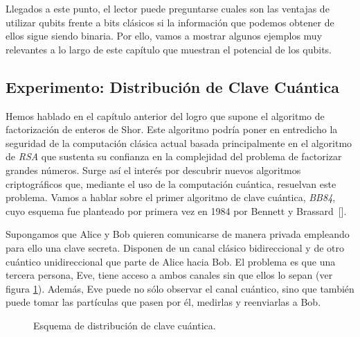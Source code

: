 Llegados a este punto, el lector puede preguntarse cuales son las ventajas de utilizar qubits frente a bits clásicos si la información que podemos obtener de ellos sigue siendo binaria. Por ello, vamos a mostrar algunos ejemplos muy relevantes a lo largo de este capítulo que muestran el potencial de los qubits.

\subsection{Experimento: Distribución de Clave Cuántica}

Hemos hablado en el capítulo anterior del logro que supone el algoritmo de factorización de enteros de Shor. Este algoritmo podría poner en entredicho la seguridad de la computación clásica actual basada principalmente en el algoritmo de \textit{RSA} que sustenta su confianza en la complejidad del problema de factorizar grandes números.
%
Surge así el interés por descubrir nuevos algoritmos criptográficos que, mediante el uso de la computación cuántica, resuelvan este problema. Vamos a hablar sobre el primer algoritmo de clave cuántica, \textit{BB84}, cuyo esquema fue planteado por primera vez en 1984 por {Bennett y Brassard}~[\cite{bennett1987quantum}].

Supongamos que Alice y Bob quieren comunicarse de manera privada empleando para ello una clave secreta. Disponen de un canal clásico bidireccional y de otro cuántico unidireccional que parte de Alice hacia Bob. El problema es que una tercera persona, Eve, tiene acceso a ambos canales sin que ellos lo sepan (ver figura \ref{fig:fig21}). Además, Eve puede no sólo observar el canal cuántico, sino que también puede tomar las partículas que pasen por él, medirlas y reenviarlas a Bob.

\begin{figure}[!htb]
\begin{center}
\end{center}
\caption{Esquema de distribución de clave cuántica.}
\label{fig:fig21}
\end{figure}


